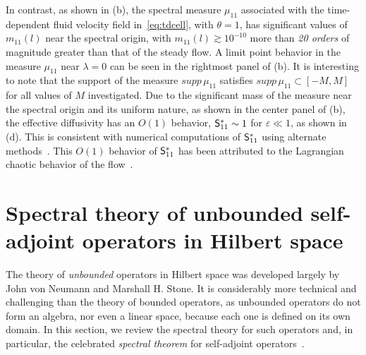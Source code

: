 \documentclass[amsa]{ipart}
\begin{document}
In contrast, as shown in (b),
the spectral measure $\mu_{11}$ associated with the time-dependent fluid
velocity field in~\eqref{eq:tdcell}, with $\theta=1$, has significant
values of $m_{11}(l)$ near the spectral origin, with
$m_{11}(l)\gtrsim10^{-10}$ more than \emph{20 orders} of magnitude greater
than  that of the steady flow. A limit point behavior in the measure
$\mu_{11}$ near $\lambda=0$ can be seen in the rightmost panel of
(b).  It is interesting to note
that the support of the measure $supp\,\mu_{11}$ satisfies
$supp\,\mu_{11}\subset[-M,M]$ for all values of $M$ investigated. Due to
the significant mass of the measure near the spectral origin and its
uniform nature, as shown in the center panel of
(b), the effective diffusivity
has an $O(1)$ behavior, $\mathsf{S}^*_{11}\sim1$ for $\varepsilon\ll1$, as shown in
(d). This is consistent with 
numerical computations of $\mathsf{S}^*_{11}$ using alternate 
methods~\cite{Biferale:PF:2725}. This $O(1)$ behavior of $\mathsf{S}^*_{11}$
has been attributed to the Lagrangian chaotic behavior of the
flow~\cite{Biferale:PF:2725,ZCX_2015}. 




  \setcounter{equation}{1}  %
  \setcounter{section}{0}  %
  \renewcommand{\theequation}{A-\arabic{equation}} 
\renewcommand{\thesection}{A-\arabic{section}}

\appendix
%

\section{Spectral theory of unbounded self-adjoint operators in
  Hilbert space} \label{app:Spectral_Theory}    
%
The theory of \emph{unbounded} operators in Hilbert
space was developed largely by John von Neumann and Marshall H. Stone. It
is considerably more technical and challenging than the theory of bounded
operators, as unbounded operators do not form an algebra, nor even a
linear space, because each one is defined on its own domain. In this
section, we review the spectral theory for such operators and, in
particular, the celebrated \emph{spectral theorem} for self-adjoint
operators~\cite{Reed-1980,Stone:64}.
\end{document}
